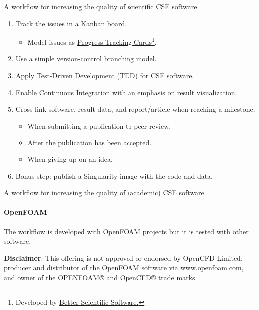 \documentclass[
	aspectratio=169,%
	color={accentcolor=2d},
	logo=true,%
	colorframetitle=true,%
	]{tudabeamer}
\begin{document}
\begin{frame}{A workflow for increasing the quality of scientific CSE software} 

    \vfill
    \begin{enumerate}
        \item Track the issues in a Kanban board. 
            \begin{itemize}
                \item Model issues as \href{https://betterscientificsoftware.github.io/PSIP-Tools/PTCs/}{Progress Tracking Cards}\footnote{Developed by \href{https://bssw.io/}{Better Scientific Software.}}.
            \end{itemize}
        \item Use a simple version-control branching model. 
        \item Apply Test-Driven Development (TDD) for CSE software.
        \item Enable Continuous Integration with an emphasis on result visualization. 
        \item Cross-link software, result data, and report/article when reaching a milestone.
            \begin{itemize}
                \item When submitting a publication to peer-review. 
                \item After the publication has been accepted. 
                \item When giving up on an idea. 
            \end{itemize}
        \item Bonus step: publish a Singularity image with the code and data.
    \end{enumerate}
\end{frame}

\begin{frame}{A workflow for increasing the quality of (academic) CSE software} 
    \framesubtitle{OpenFOAM}

        \vfill

        The workflow is developed with OpenFOAM projects but it is tested with other software. 

        \vspace{1cm}

        \textbf{Disclaimer}: This offering is not approved or endorsed by OpenCFD Limited, producer and distributor of the OpenFOAM software via www.openfoam.com, and owner of the OPENFOAM®  and OpenCFD®  trade marks. 

\end{frame}
\end{document}
